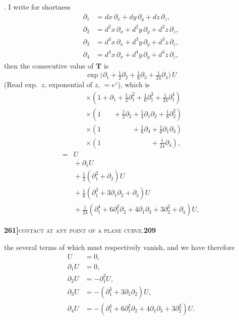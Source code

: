 \documentclass[11pt]{article}
\begin{document}
\medskip

. I write for shortness
\[
\begin{aligned}
\partial_1 &= dx\,\partial_x + dy\,\partial_y + dz\,\partial_z,\\
\partial_2 &= d^2x\,\partial_x + d^2y\,\partial_y + d^2z\,\partial_z,\\
\partial_3 &= d^3x\,\partial_x + d^3y\,\partial_y + d^3z\,\partial_z,\\
\partial_4 &= d^4x\,\partial_x + d^4y\,\partial_y + d^4z\,\partial_z,
\end{aligned}
\]
then the consecutive value of $\mathbf{T}$ is
\[
\exp\bigl(\partial_1 + \tfrac{1}{2}\partial_2 + \tfrac{1}{6}\partial_3 + \tfrac{1}{24}\partial_4\bigr)\,U
\]
(Read exp.\ $z$, exponential of $z$, $= e^z$), which is
\[
\begin{aligned}
&\times (1 + \partial_1 + \tfrac{1}{2}\partial_1^2 + \tfrac{1}{6}\partial_1^3 + \tfrac{1}{24}\partial_1^4)\\
&\times (1\phantom{+ \partial_1} + \tfrac{1}{2}\partial_2 + \tfrac{1}{4}\partial_1\partial_2 + \tfrac{1}{8}\partial_2^2)\\
&\times (1\phantom{+ \partial_1 + \tfrac{1}{2}\partial_2} + \tfrac{1}{6}\partial_3 + \tfrac{1}{6}\partial_1\partial_3)\\
&\times (1\phantom{+ \partial_1 + \tfrac{1}{2}\partial_2 + \tfrac{1}{6}\partial_3} + \tfrac{1}{24}\partial_4),
\end{aligned}
\]
\[
\begin{aligned}
={}& U\\
&{} + \partial_1 U\\
&{} + \tfrac{1}{2}(\partial_1^2 + \partial_2)U\\
&{} + \tfrac{1}{6}(\partial_1^3 + 3\partial_1\partial_2 + \partial_3)U\\
&{} + \tfrac{1}{24}(\partial_1^4 + 6\partial_1^2\partial_2 + 4\partial_1\partial_3 + 3\partial_2^2 + \partial_4)U,
\end{aligned}
\]

\newpage

\noindent\textbf{261]}\hfill\textsc{contact at any point of a plane curve.}\hfill\textbf{209}

\medskip

\noindent the several terms of which must respectively vanish, and we have therefore
\[
\begin{aligned}
U &= 0,\\
\partial_1 U &= 0,\\
\partial_2 U &= -\partial_1^2 U,\\
\partial_3 U &= -(\partial_1^3 + 3\partial_1\partial_2)U,\\
\partial_4 U &= -(\partial_1^4 + 6\partial_1^2\partial_2 + 4\partial_1\partial_3 + 3\partial_2^2)U.
\end{aligned}
\]
\end{document}
